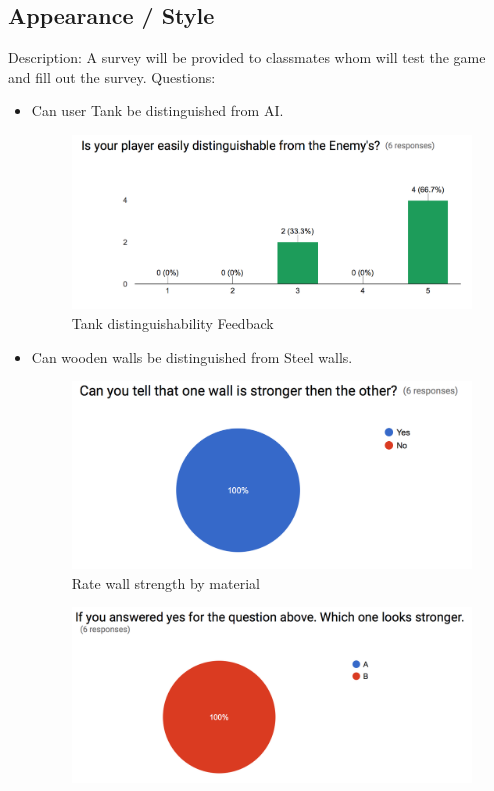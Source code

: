 \documentclass{article}
\begin{document}
\subsection{Appearance / Style}
\label{sec:4.1}
Description: A survey will be provided to classmates whom will test the game 
and fill out the survey.  \newline
Questions: 
\begin{itemize}
\item Can user Tank be distinguished from AI.
\begin{figure}[H]
	\centering
	\includegraphics[width=\textwidth]{./Figures/1.png}
	\caption{Tank distinguishability Feedback}
\end{figure}
\item Can wooden walls be distinguished from Steel walls.
\begin{figure}[H]
	\centering
	\includegraphics[width=\textwidth]{./Figures/4.png}
	\caption{Rate wall strength by material}
\end{figure}
\begin{figure}[H]
	\centering
	\includegraphics[width=\textwidth]{./Figures/6.png}

\end{figure}
\end{itemize}
\end{document}
